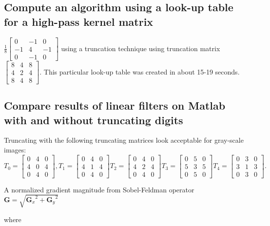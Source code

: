 \documentclass[12pt]{amsart}
\theoremstyle{definition}
\theoremstyle{remark}
\numberwithin{thm}{section}
\begin{document}
\subsection{Compute an algorithm using a look-up table for a high-pass kernel matrix} 
$\frac{1}{8}
\begin{bmatrix}
0 & -1 & 0\\
-1 & 4 & -1\\
0 & -1 & 0
\end{bmatrix}$ using a truncation technique using truncation matrix
$\begin{bmatrix}
8 &4 &8\\
4 &2 &4\\
8 &4 &8
\end{bmatrix}$. This particular look-up table was created in about 15-19 seconds.

\subsection{
Compare results of linear filters on Matlab with and without truncating digits}
Truncating with the following truncating matrices look acceptable for gray-scale images:
$
T_0=
\begin{bmatrix}
0 &4 &0\\
4 &0 &4\\
0 &4 &0
\end{bmatrix},
T_1=
\begin{bmatrix}
0 &4 &0\\
4 &1 &4\\
0 &4 &0
\end{bmatrix}
T_2=
\begin{bmatrix}
0 &4 &0\\
4 &2 &4\\
0 &4 &0
\end{bmatrix}
T_3=
\begin{bmatrix}
0 &5 &0\\
5 &3 &5\\ 
0 &5 &0
\end{bmatrix}
T_4=
\begin{bmatrix}
0 &3 &0\\
3 &1 &3\\
0 &3 &0
\end{bmatrix}
.$

A normalized gradient magnitude from Sobel-Feldman operator \cite{Wikipedia/Sobel}
$\mathbf{G} = \sqrt{ {\mathbf{G}_x}^2 + {\mathbf{G}_y}^2 }$

where
\end{document}
